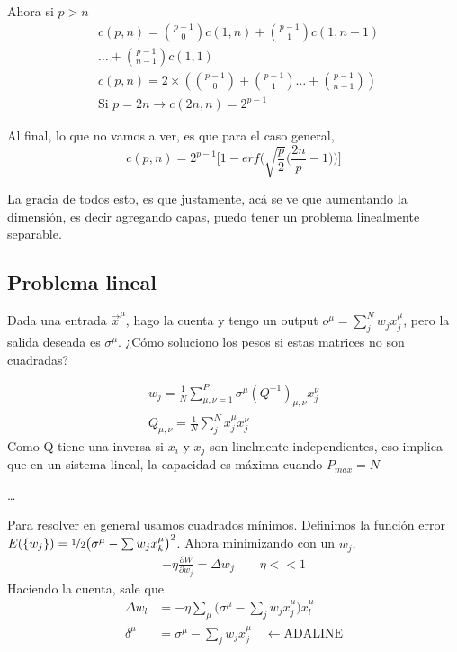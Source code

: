Ahora si $p>n$
\begin{align}
	&c(p,n)=\binom{p-1}{0}c(1,n) + \binom{p-1}{1}c(1,n-1) \\
	&\dots + \binom{p-1}{n-1}c(1,1)\\
	&c(p,n)=2\times(\binom{p-1}{0} + \binom{p-1}{1}\dots + \binom{p-1}{n-1})\\
	&\text{Si }p=2n \rightarrow c(2n,n) = 2^{p-1}
\end{align}

Al final, lo que no vamos a ver, es que para el caso general, 
\begin{equation}
	c(p,n) = 2^{p-1} \bigg[ 1- erf \bigg( \sqrt{\frac{p}{2}} \big(\frac{2n}{p}-1\big)\bigg) \bigg]
\end{equation}

La gracia de todos esto, es que justamente, acá se ve que aumentando la dimensión, es decir agregando capas, puedo tener un problema linealmente separable. 

\subsection{Problema lineal}

Dada una entrada $\vec x ^\mu$, hago la cuenta y tengo un output $o ^\mu = \sum^N _j w_j x^\mu _j$, pero la salida deseada es $\sigma^\mu$. ¿Cómo soluciono los pesos si estas matrices no son cuadradas?

\begin{align}
	w_{j} = \frac{1}{N}\sum^P _{\mu,\nu=1} \sigma ^\mu (Q^{-1})_{\mu,\nu} x^\nu_j\\
	Q_{\mu,\nu}= \frac{1}{N} \sum^N_j x^\mu_j x^\nu_j
\end{align}
Como Q tiene una inversa si $x_i$ y $x_j$ son linelmente independientes, eso implica que en un sistema lineal, la capacidad es máxima cuando $P_{max}=N$

\dots

Para resolver en general usamos cuadrados mínimos. Definimos la función error $E(\{ w_j\}) = \nicefrac{1}{2} \big( \sigma^\mu - \sum w_j x_k^\mu \big)^2$. Ahora minimizando con un   $w_j$,
\begin{align}
	-\eta \frac{\partial W}{\partial w_j} = \Delta w_j \qquad \eta << 1
\end{align}
Haciendo la cuenta,  sale que
\begin{align}
    \Delta w_l &= -\eta \sum_\mu \bigg( \sigma ^ \mu - \sum_j w_jx_j^\mu\bigg) x^\mu_l\\
    \delta^\mu &= \sigma ^ \mu - \sum_j w_jx_j^\mu \quad \leftarrow \text{ADALINE}
\end{align}

